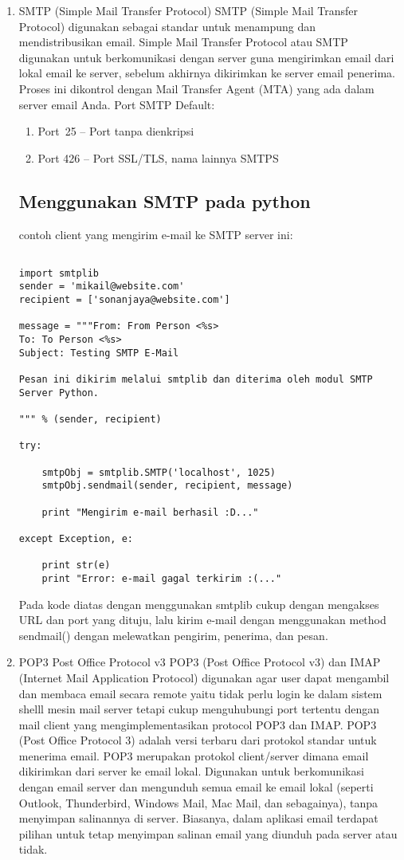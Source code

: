 	\begin{enumerate}
		\item  SMTP (Simple Mail Transfer Protocol) 
		 	SMTP (Simple Mail Transfer Protocol) digunakan sebagai standar untuk menampung dan mendistribusikan email. Simple Mail Transfer Protocol atau SMTP digunakan untuk berkomunikasi dengan server guna mengirimkan email dari lokal email ke server, sebelum akhirnya dikirimkan ke server email penerima. Proses ini dikontrol dengan Mail Transfer Agent (MTA) yang ada dalam server email Anda. Port SMTP Default:
			   
			\begin{enumerate}
				\item Port~25 –  Port tanpa dienkripsi
				\item Port 426 – Port SSL/TLS, nama lainnya SMTPS
			\end{enumerate}
\subsection {Menggunakan SMTP pada python}
contoh client yang mengirim e-mail ke SMTP server ini:
\begin {verbatim}

import smtplib
sender = 'mikail@website.com'
recipient = ['sonanjaya@website.com']

message = """From: From Person <%
To: To Person <%
Subject: Testing SMTP E-Mail

Pesan ini dikirim melalui smtplib dan diterima oleh modul SMTP Server Python.

""" %

try:

   	smtpObj = smtplib.SMTP('localhost', 1025)
   	smtpObj.sendmail(sender, recipient, message)    

   	print "Mengirim e-mail berhasil :D..."

except Exception, e:

	print str(e)
   	print "Error: e-mail gagal terkirim :(..."
\end{verbatim}

Pada kode diatas dengan menggunakan smtplib cukup dengan mengakses URL dan port yang dituju, lalu kirim e-mail dengan menggunakan method sendmail() dengan melewatkan pengirim, penerima, dan pesan.

		\item {POP3 Post Office Protocol v3}
			POP3 (Post Office Protocol v3) dan IMAP (Internet Mail Application Protocol) digunakan agar user dapat mengambil dan membaca email secara remote yaitu tidak perlu login ke dalam sistem shelll mesin mail server tetapi cukup menguhubungi port tertentu dengan mail client yang mengimplementasikan protocol POP3 dan IMAP.
			POP3 (Post Office Protocol 3) adalah versi terbaru dari protokol standar untuk menerima email. POP3 merupakan protokol client/server dimana email dikirimkan dari server ke email lokal. Digunakan untuk berkomunikasi dengan email server dan mengunduh semua email ke email lokal (seperti Outlook, Thunderbird, Windows Mail, Mac Mail, dan sebagainya), tanpa menyimpan salinannya di server. Biasanya, dalam aplikasi email terdapat pilihan untuk tetap menyimpan salinan email yang diunduh pada server atau tidak.


\end{enumerate}
